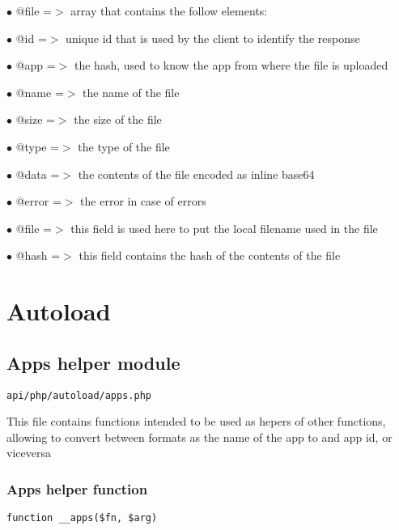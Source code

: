 \documentclass[a4paper]{article}
\begin{document}
\begin{compactitem}
\item[\color{myblue}$\bullet$] @file  =$>$ array that contains the follow elements:
\item[\color{myblue}$\bullet$] @id    =$>$ unique id that is used by the client to identify the response
\item[\color{myblue}$\bullet$] @app   =$>$ the hash, used to know the app from where the file is uploaded
\item[\color{myblue}$\bullet$] @name  =$>$ the name of the file
\item[\color{myblue}$\bullet$] @size  =$>$ the size of the file
\item[\color{myblue}$\bullet$] @type  =$>$ the type of the file
\item[\color{myblue}$\bullet$] @data  =$>$ the contents of the file encoded as inline base64
\item[\color{myblue}$\bullet$] @error =$>$ the error in case of errors
\item[\color{myblue}$\bullet$] @file  =$>$ this field is used here to put the local filename used in the file
\item[\color{myblue}$\bullet$] @hash  =$>$ this field contains the hash of the contents of the file
\end{compactitem}


\hypertarget{toc14}{}
\section{Autoload}

\hypertarget{toc15}{}
\subsection{Apps helper module}

\begin{lstlisting}
api/php/autoload/apps.php
\end{lstlisting}

This file contains functions intended to be used as hepers of other functions, allowing to convert
between formats as the name of the app to and app id, or viceversa

\hypertarget{toc16}{}
\subsubsection{Apps helper function}

\begin{lstlisting}
function __apps($fn, $arg)
\end{lstlisting}
\end{document}

